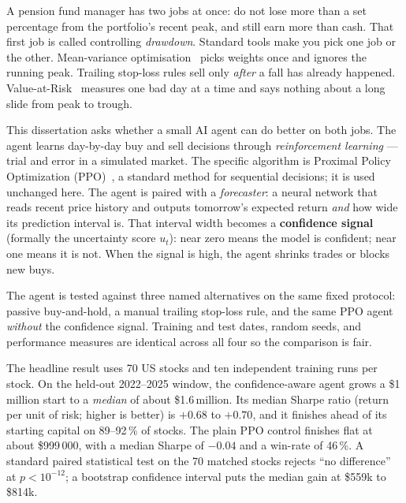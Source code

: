 
A pension fund manager has two jobs at once: do not lose more than a set percentage from the portfolio's recent peak, and still earn more than cash. That first job is called controlling \emph{drawdown}. Standard tools make you pick one job or the other. Mean-variance optimisation~\parencite{markowitz1952portfolio} picks weights once and ignores the running peak. Trailing stop-loss rules sell only \emph{after} a fall has already happened. Value-at-Risk~\parencite{rockafellar2000optimization} measures one bad day at a time and says nothing about a long slide from peak to trough.

This dissertation asks whether a small AI agent can do better on both jobs. The agent learns day-by-day buy and sell decisions through \emph{reinforcement learning} --- trial and error in a simulated market. The specific algorithm is Proximal Policy Optimization (PPO)~\parencite{schulman2017ppo}, a standard method for sequential decisions; it is used unchanged here. The agent is paired with a \emph{forecaster}: a neural network that reads recent price history and outputs tomorrow's expected return \emph{and} how wide its prediction interval is. That interval width becomes a \textbf{confidence signal} (formally the uncertainty score $u_t$): near zero means the model is confident; near one means it is not. When the signal is high, the agent shrinks trades or blocks new buys.

The agent is tested against three named alternatives on the same fixed protocol: passive buy-and-hold, a manual trailing stop-loss rule, and the same PPO agent \emph{without} the confidence signal. Training and test dates, random seeds, and performance measures are identical across all four so the comparison is fair.

The headline result uses 70 US stocks and ten independent training runs per stock. On the held-out 2022--2025 window, the confidence-aware agent grows a \$1\,million start to a \emph{median} of about \$1.6\,million. Its median Sharpe ratio (return per unit of risk; higher is better) is $+0.68$ to $+0.70$, and it finishes ahead of its starting capital on 89--92\,\% of stocks. The plain PPO control finishes flat at about \$999\,000, with a median Sharpe of $-0.04$ and a win-rate of 46\,\%. A standard paired statistical test on the 70 matched stocks rejects ``no difference'' at $p < 10^{-12}$; a bootstrap confidence interval puts the median gain at \$559k to \$814k.

